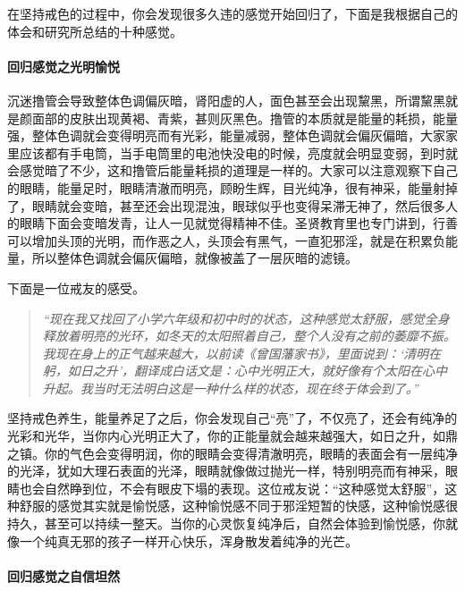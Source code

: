 在坚持戒色的过程中，你会发现很多久违的感觉开始回归了，下面是我根据自己的体会和研究所总结的十种感觉。

\paragraph{回归感觉之光明愉悦}

沉迷撸管会导致整体色调偏灰暗，肾阳虚的人，面色甚至会出现黧黑，所谓黧黑就是颜面部的皮肤出现黄褐、青紫，甚则灰黑色。撸管的本质就是能量的耗损，能量强，整体色调就会变得明亮而有光彩，能量减弱，整体色调就会偏灰偏暗，大家家里应该都有手电筒，当手电筒里的电池快没电的时候，亮度就会明显变弱，到时就会感觉暗了不少，这和撸管后能量耗损的道理是一样的。大家可以注意观察下自己的眼睛，能量足时，眼睛清澈而明亮，顾盼生辉，目光纯净，很有神采，能量射掉了，眼睛就会变暗，甚至还会出现混浊，眼球似乎也变得呆滞无神了，然后很多人的眼睛下面会变暗发青，让人一见就觉得精神不佳。圣贤教育里也专门讲到，行善可以增加头顶的光明，而作恶之人，头顶会有黑气，一直犯邪淫，就是在积累负能量，所以整体色调就会偏灰偏暗，就像被盖了一层灰暗的滤镜。

下面是一位戒友的感受。

\begin{quote}\it
    “现在我又找回了小学六年级和初中时的状态，这种感觉太舒服，感觉全身释放着明亮的光环，如冬天的太阳照着自己，整个人没有之前的萎靡不振。我现在身上的正气越来越大，以前读《曾国藩家书》，里面说到：‘清明在躬，如日之升’，翻译成白话文是：心中光明正大，就好像有个太阳在心中升起。我当时无法明白这是一种什么样的状态，现在终于体会到了。”
\end{quote}

坚持戒色养生，能量养足了之后，你会发现自己“亮”了，不仅亮了，还会有纯净的光彩和光华，当你内心光明正大了，你的正能量就会越来越强大，如日之升，如鼎之镇。你的气色会变得明润，你的眼睛会变得清澈明亮，眼睛的表面会有一层纯净的光泽，犹如大理石表面的光泽，眼睛就像做过抛光一样，特别明亮而有神采，眼睛也会自然睁到位，不会有眼皮下塌的表现。这位戒友说：“这种感觉太舒服”，这种舒服的感觉其实就是愉悦感，这种愉悦感不同于邪淫短暂的快感，这种愉悦感很持久，甚至可以持续一整天。当你的心灵恢复纯净后，自然会体验到愉悦感，你就像一个纯真无邪的孩子一样开心快乐，浑身散发着纯净的光芒。

\paragraph{回归感觉之自信坦然}

